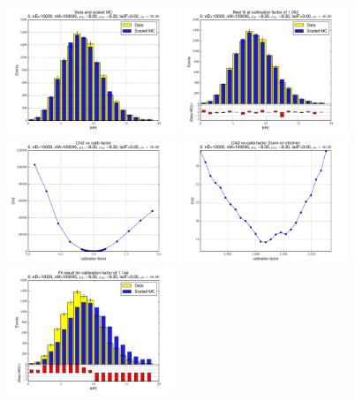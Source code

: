
 \begin{figure}[htbp] \begin{center} 
\includegraphics[width=0.45\textwidth]{../FIGURES/00/FIG_Data_and_scaled_MC.pdf} 
\includegraphics[width=0.45\textwidth]{../FIGURES/00/FIG_Best_fit_at_calibration_factor_of_1_002.pdf} 
\includegraphics[width=0.45\textwidth]{../FIGURES/00/FIG_Chi2_vs_calib_factor.pdf} 
\includegraphics[width=0.45\textwidth]{../FIGURES/00/FIG_Chi2_vs_calib_factor_Zoom_on_chi2min.pdf} 
\includegraphics[width=0.45\textwidth]{../FIGURES/00/FIG_Fit_result_for_calibration_factor_of_1_144.pdf} 

\end{center}
\end{figure}

